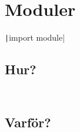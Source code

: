 \mode*

\section{Moduler}

\begin{frame}[fragile]
  \texttt|import module|
\end{frame}

\subsection{Hur?}

\begin{frame}[fragile]
  \begin{example}
    \inputminted[firstline=3,highlightlines=7]{python}{examples/good_module.py}
  \end{example}

  \begin{example}
    \inputminted[firstline=3]{python}{examples/bad_module.py}
  \end{example}
\end{frame}


\subsection{Varför?}


\begin{frame}[fragile]
  \begin{example}
    \inputminted[firstline=1,lastline=13]{python}{examples/input_type.py}
  \end{example}
\end{frame}

